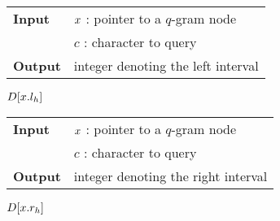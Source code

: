 \begin{figure*}
\begin{minipage}[t]{.5\textwidth}
\begin{algorithm}[H]
\begin{tabular}{ll}
\textbf{Input}  & $x$ : pointer to a $q$-gram node\\
				& $c$ : character to query\\
\textbf{Output} & integer denoting the left interval\\
\end{tabular}
\begin{algorithmic}[1]
\State \Return $D[x.l_h]$
\end{algorithmic}
\label{alg:qgram-lower}
\end{algorithm}
\end{minipage}
\hfill
\begin{minipage}[t]{.5\textwidth}
\begin{algorithm}[H]
\begin{tabular}{ll}
\textbf{Input}  & $x$ : pointer to a $q$-gram node\\
				& $c$ : character to query\\
\textbf{Output} & integer denoting the right interval\\
\end{tabular}
\begin{algorithmic}[1]
\State \Return $D[x.r_h]$
\end{algorithmic}
\label{alg:qgram-upper}
\end{algorithm}
\end{minipage}
\end{figure*}

